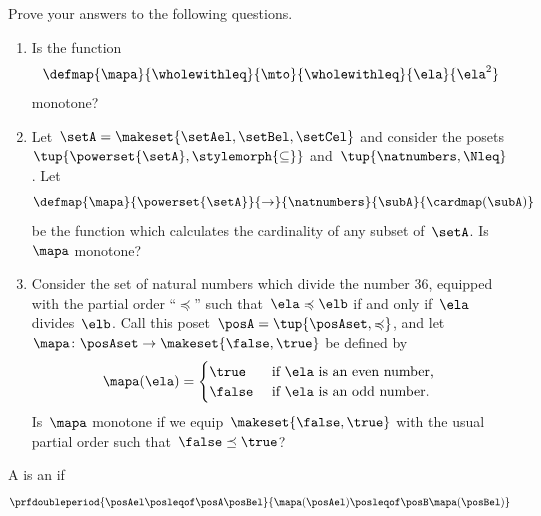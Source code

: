 \clearpage
\vfill
\begin{gradedexercise}
    \label{ex:MonotoneMapCheck}

    Prove your answers to the following questions.
    \begin{enumerate}
        \item Is the function
              \begin{equation*}
                  \defmap{\mapa}{\wholewithleq}{\mto}{\wholewithleq}{\ela}{\ela^2}
              \end{equation*}
              monotone?
        \item Let~$\setA = \makeset{\setAel, \setBel, \setCel}$ and consider the posets~$\tup{\powerset{\setA}, \stylemorph{\subseteq}}$ and~$\tup{\natnumbers, \Nleq}$.
              Let
              \begin{equation*}
                  \defmap{\mapa}{\powerset{\setA}}{\to}{\natnumbers}{\subA}{\cardmap(\subA)}
              \end{equation*}
              be the function which calculates the cardinality of any subset of~$\setA$.
              Is~$\mapa$ monotone?
        \item Consider the set of natural numbers which divide the number 36, equipped with the partial order ``$\preccurlyeq$'' such that~$\ela \preccurlyeq \elb$ if and only if~$\ela$ divides~$\elb$.
              Call this poset~$\posA = \tup{\posAset, \preccurlyeq}$, and let~$\mapa \colon \posAset \to \makeset{\false, \true}$ be defined by
              \begin{equation}
                  \mapa(\ela) =
                  \begin{cases}
                      \true  & \text{ if } \ela \text{ is an even number, } \\
                      \false & \text{ if } \ela \text{ is an odd number.
                      }
                  \end{cases}
              \end{equation}
              Is~$\mapa$ monotone if we equip~$\makeset{\false, \true}$ with the usual partial order such that~$\false \preceq \true$?
    \end{enumerate}
\end{gradedexercise}

\begin{ctdefinition}
    \label{def:order-isomorphism}
    A  is an  if
    \begin{equation}
        \prfdoubleperiod{
            \posAel \posleqof\posA \posBel
        }{
            \mapa(\posAel) \posleqof\posB \mapa(\posBel)
        }
    \end{equation}
\end{ctdefinition}

